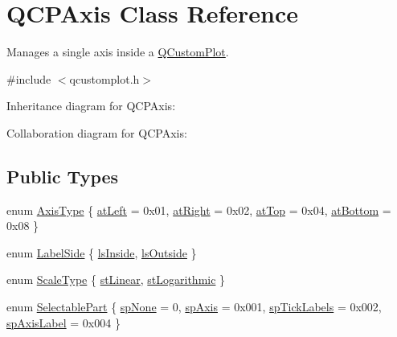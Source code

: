 \hypertarget{class_q_c_p_axis}{}\section{Q\+C\+P\+Axis Class Reference}
\label{class_q_c_p_axis}


Manages a single axis inside a \hyperlink{class_q_custom_plot}{Q\+Custom\+Plot}.  




{\ttfamily \#include $<$qcustomplot.\+h$>$}



Inheritance diagram for Q\+C\+P\+Axis\+:


Collaboration diagram for Q\+C\+P\+Axis\+:
\subsection*{Public Types}
\begin{DoxyCompactItemize}
\item 
enum \hyperlink{class_q_c_p_axis_ae2bcc1728b382f10f064612b368bc18a}{Axis\+Type} \{ \hyperlink{class_q_c_p_axis_ae2bcc1728b382f10f064612b368bc18aaf84aa6cac6fb6099f54a2cbf7546b730}{at\+Left} = 0x01, 
\hyperlink{class_q_c_p_axis_ae2bcc1728b382f10f064612b368bc18aadf5509f7d29199ef2f263b1dd224b345}{at\+Right} = 0x02, 
\hyperlink{class_q_c_p_axis_ae2bcc1728b382f10f064612b368bc18aac0ece2b680d3f545e701f75af1655977}{at\+Top} = 0x04, 
\hyperlink{class_q_c_p_axis_ae2bcc1728b382f10f064612b368bc18aa220d68888516b6c3b493d144f1ba438f}{at\+Bottom} = 0x08
 \}
\item 
enum \hyperlink{class_q_c_p_axis_a24b13374b9b8f75f47eed2ea78c37db9}{Label\+Side} \{ \hyperlink{class_q_c_p_axis_a24b13374b9b8f75f47eed2ea78c37db9aae7b027ac2839cf4ad611df30236fc3f}{ls\+Inside}, 
\hyperlink{class_q_c_p_axis_a24b13374b9b8f75f47eed2ea78c37db9a2eadb509fc0c9a8b35b85c86ec9f3c7a}{ls\+Outside}
 \}
\item 
enum \hyperlink{class_q_c_p_axis_a36d8e8658dbaa179bf2aeb973db2d6f0}{Scale\+Type} \{ \hyperlink{class_q_c_p_axis_a36d8e8658dbaa179bf2aeb973db2d6f0aff6e30a11a828bc850caffab0ff994f6}{st\+Linear}, 
\hyperlink{class_q_c_p_axis_a36d8e8658dbaa179bf2aeb973db2d6f0abf5b785ad976618816dc6f79b73216d4}{st\+Logarithmic}
 \}
\item 
enum \hyperlink{class_q_c_p_axis_abee4c7a54c468b1385dfce2c898b115f}{Selectable\+Part} \{ \hyperlink{class_q_c_p_axis_abee4c7a54c468b1385dfce2c898b115fae0df8123a5528d5ccf87cb7794f971ea}{sp\+None} = 0, 
\hyperlink{class_q_c_p_axis_abee4c7a54c468b1385dfce2c898b115fa8949d2c1a31eccae9be7ed32e7a1ae38}{sp\+Axis} = 0x001, 
\hyperlink{class_q_c_p_axis_abee4c7a54c468b1385dfce2c898b115fa584e0a3dc4d064880647619f4bd4e771}{sp\+Tick\+Labels} = 0x002, 
\hyperlink{class_q_c_p_axis_abee4c7a54c468b1385dfce2c898b115fa851e0600e0d08b4f5fee9361e3fedabd}{sp\+Axis\+Label} = 0x004
 \}
\end{DoxyCompactItemize}
